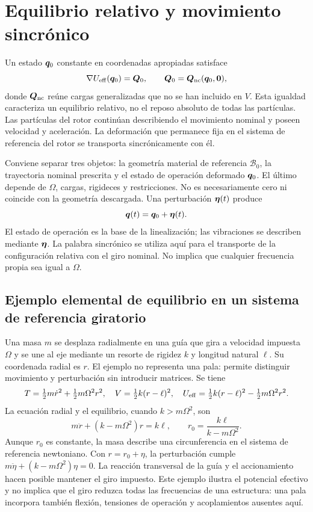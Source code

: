 \section{Equilibrio relativo y movimiento sincrónico}
Un estado $\bm{q}_0$ constante en coordenadas apropiadas satisface
\begin{equation}
 \nabla U_{\rm eff}(\bm{q}_0)=\bm{Q}_0,
 \qquad \bm{Q}_0=\bm{Q}_{\rm nc}(\bm{q}_0,\bm{0}),
 \label{eq:equilibrio}
\end{equation}
donde $\bm{Q}_{\rm nc}$ reúne cargas generalizadas que no se han incluido en $V$. Esta igualdad caracteriza un equilibrio relativo, no el reposo absoluto de todas las partículas. Las partículas del rotor continúan describiendo el movimiento nominal y poseen velocidad y aceleración. La deformación que permanece fija en el sistema de referencia del rotor se transporta sincrónicamente con él.

Conviene separar tres objetos: la geometría material de referencia $\mathcal B_0$, la trayectoria nominal prescrita y el estado de operación deformado $\bm{q}_0$. El último depende de $\Omega$, cargas, rigideces y restricciones. No es necesariamente cero ni coincide con la geometría descargada. Una perturbación $\bm{\eta}(t)$ produce
\begin{equation}
 \bm{q}(t)=\bm{q}_0+\bm{\eta}(t).
\end{equation}
El estado de operación es la base de la linealización; las vibraciones se describen mediante $\bm{\eta}$. La palabra sincrónico se utiliza aquí para el transporte de la configuración relativa con el giro nominal. No implica que cualquier frecuencia propia sea igual a $\Omega$.

\subsection{Ejemplo elemental de equilibrio en un sistema de referencia giratorio}
Una masa $m$ se desplaza radialmente en una guía que gira a velocidad impuesta $\Omega$ y se une al eje mediante un resorte de rigidez $k$ y longitud natural $\ell$. Su coordenada radial es $r$. El ejemplo no representa una pala: permite distinguir movimiento y perturbación sin introducir matrices. Se tiene
\begin{equation}
 T=\tfrac12m\dot r^2+\tfrac12m\Omega^2r^2,
 \quad V=\tfrac12k(r-\ell)^2,
 \quad U_{\rm eff}=\tfrac12k(r-\ell)^2-\tfrac12m\Omega^2r^2.
\end{equation}
La ecuación radial y el equilibrio, cuando $k>m\Omega^2$, son
\begin{equation}
 m\ddot r+(k-m\Omega^2)r=k\ell,
 \qquad r_0=\frac{k\ell}{k-m\Omega^2}.
\end{equation}
Aunque $r_0$ es constante, la masa describe una circunferencia en el sistema de referencia newtoniano. Con $r=r_0+\eta$, la perturbación cumple $m\ddot\eta+(k-m\Omega^2)\eta=0$. La reacción transversal de la guía y el accionamiento hacen posible mantener el giro impuesto. Este ejemplo ilustra el potencial efectivo y no implica que el giro reduzca todas las frecuencias de una estructura: una pala incorpora también flexión, tensiones de operación y acoplamientos ausentes aquí.

